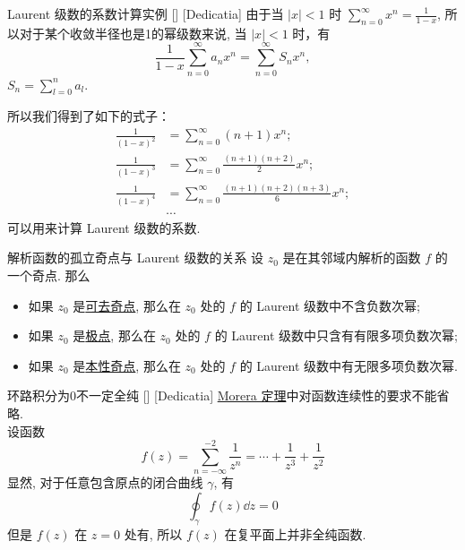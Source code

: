         \begin{xmp}
            {Laurent 级数的系数计算实例}
            []
            [Dedicatia]
            由于当 $|x|<1$ 时 $\sum\limits_{n=0}^{\infty}x^n=\frac{1}{1-x}$, 所以对于某个收敛半径也是1的幂级数来说, 当 $|x|<1$ 时，有
            \[\frac{1}{1-x}\sum_{n=0}^{\infty}a_nx^n=\sum_{n=0}^{\infty}S_nx^n,\]
            $S_n=\sum\limits_{l=0}^na_l$.

            所以我们得到了如下的式子：
            \begin{align*}
                \frac{1}{(1-x)^2}&=\sum_{n=0}^{\infty}(n+1)x^n;\\
                \frac{1}{(1-x)^3}&=\sum_{n=0}^{\infty}\frac{(n+1)(n+2)}{2}x^n;\\
                \frac{1}{(1-x)^4}&=\sum_{n=0}^{\infty}\frac{(n+1)(n+2)(n+3)}{6}x^n;\\
                &\cdots 
            \end{align*}
            可以用来计算 Laurent 级数的系数.
        \end{xmp}

        \begin{thm}
            {解析函数的孤立奇点与 Laurent 级数的关系}
            设 \(z_0\) 是在其邻域内解析的函数 \(f\) 的一个奇点. 那么
            \begin{itemize}
                \item 如果 \(z_0\) 是\hyperref[dfn:Removable-Singularity]{可去奇点}, 那么在 \(z_0\) 处的 \(f\) 的 Laurent 级数中不含负数次幂; 
                \item 如果 \(z_0\) 是\hyperref[dfn:Pole]{极点}, 那么在 \(z_0\) 处的 \(f\) 的 Laurent 级数中只含有有限多项负数次幂; 
                \item 如果 \(z_0\) 是\hyperref[dfn:Essential-Singularity]{本性奇点}, 那么在 \(z_0\) 处的 \(f\) 的 Laurent 级数中有无限多项负数次幂. 
            \end{itemize}
        \end{thm}

        \begin{cxmp}
            []
            {环路积分为0不一定全纯}
            []
            [Dedicatia]
            \hyperref[thm:Morera]{Morera 定理}中对函数连续性的要求不能省略.\\
            设函数
            \[f(z)=\sum_{n=-\infty}^{-2}\frac{1}{z^n}=\cdots+ \frac{1}{z^3}+\frac{1}{z^2}\]
            显然, 对于任意包含原点的闭合曲线 \(\gamma\), 有
            \[\oint_{\gamma}f(z)\dd{z}=0\]
            但是 \(f(z)\) 在 \(z=0\) 处有\EssentialSingularity, 所以 \(f(z)\) 在复平面上并非全纯函数.
        \end{cxmp}

